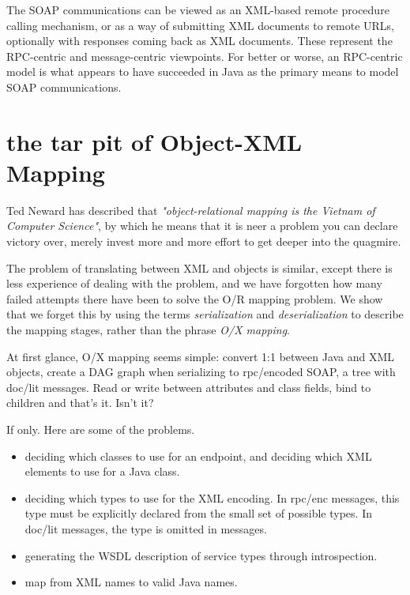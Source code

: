 \documentclass[draft]{article}
\begin{document}
The SOAP communications can be viewed as an XML-based remote procedure
calling mechanism, or as a way of submitting XML documents to remote
URLs, optionally with responses coming back as XML documents. These
represent the RPC-centric and message-centric viewpoints. For better or
worse, an RPC-centric model is what appears to have succeeded in Java as
the primary means to model SOAP communications. 





\section{the tar pit of Object-XML Mapping}

Ted Neward has described that \emph{"object-relational mapping is the Vietnam of
Computer Science"}, by which he means that it is neer a problem you can declare
victory over, merely invest more and more effort to get deeper into the
quagmire.

The problem of translating between XML and objects is similar, except there is
less experience of dealing with the problem, and we have forgotten how many
failed attempts there have been to solve the O/R mapping problem. We show that
we forget this by using the terms \emph{serialization} and \emph{deserialization} 
to describe the mapping stages, rather than the phrase \emph{O/X mapping}.

At first glance, O/X mapping seems simple: convert 1:1 between Java and XML
objects, create a DAG graph when serializing to rpc/encoded SOAP, a tree with
doc/lit messages. Read or write between attributes and class fields, bind to
children and that's it. Isn't it? 

If only. Here are some of the problems.

\begin{itemize}

\item deciding which classes to use for an endpoint, and
deciding which XML elements to use for a Java class. 

\item deciding which types to use for the XML encoding. In rpc/enc messages,
this type must be explicitly declared from the small set of possible types. In
doc/lit messages, the type is omitted in messages. 

\item generating the WSDL description of service types through introspection.

\item map from XML names to valid Java names.

\end{itemize}
\end{document}
